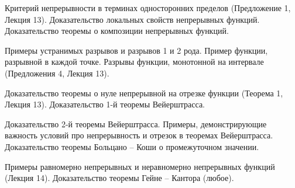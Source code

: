 \begin{problem}
Критерий непрерывности в терминах односторонних пределов (Предложение 1, Лекция
13). Доказательство локальных свойств непрерывных функций. Доказательство теоремы
о композиции непрерывных функций.
\end{problem}

\newpage
\begin{problem}
Примеры устранимых разрывов и разрывов 1 и 2 рода. Пример функции, разрывной в
каждой точке. Разрывы функции, монотонной на интервале (Предложения 4, Лекция 13).
\end{problem}

\newpage
\begin{problem}
Доказательство теоремы о нуле непрерывной на отрезке функции (Теорема 1, Лекция
13). Доказательство 1-й теоремы Вейерштрасса.
\end{problem}

\newpage
\begin{problem}
Доказательство 2-й теоремы Вейерштрасса. Примеры, демонстрирующие важность условий про непрерывность и отрезок в теоремах Вейерштрасса. Доказательство теоремы
Больцано – Коши о промежуточном значении.
\end{problem}
\newpage

\begin{problem}
Примеры равномерно непрерывных и неравномерно непрерывных функций (Лекция
14). Доказательство теоремы Гейне – Кантора (любое).
\end{problem}


